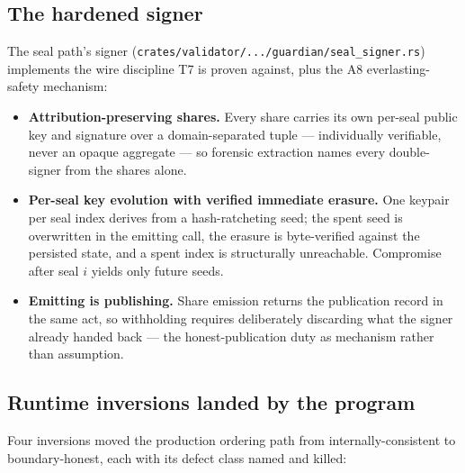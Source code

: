 \documentclass[11pt]{article}
\newcommand{\code}[1]{\texttt{#1}}
\begin{document}
\subsection{The hardened signer}

The seal path's signer (\code{crates/validator/.../guardian/seal\_signer.rs})
implements the wire discipline T7 is proven against, plus the A8
everlasting-safety mechanism:

\begin{itemize}[leftmargin=1.5em]
\item \textbf{Attribution-preserving shares.} Every share carries its own
per-seal public key and signature over a domain-separated tuple ---
individually verifiable, never an opaque aggregate --- so forensic
extraction names every double-signer from the shares alone.
\item \textbf{Per-seal key evolution with verified immediate erasure.}
One keypair per seal index derives from a hash-ratcheting seed; the spent
seed is overwritten in the emitting call, the erasure is byte-verified
against the persisted state, and a spent index is structurally
unreachable. Compromise after seal \(i\) yields only future seeds.
\item \textbf{Emitting is publishing.} Share emission returns the
publication record in the same act, so withholding requires deliberately
discarding what the signer already handed back --- the honest-publication
duty as mechanism rather than assumption.
\end{itemize}

\subsection{Runtime inversions landed by the program}

Four inversions moved the production ordering path from
internally-consistent to boundary-honest, each with its defect class
named and killed:
\end{document}
